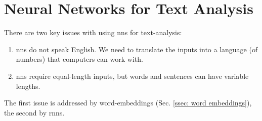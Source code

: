 \section{Neural Networks for Text Analysis \label{sec: NNs for text}}
    There are two key issues with using \glspl{nn} for text-analysis:
    
    \begin{enumerate}
    \item \glspl{nn} do not speak English. We need to translate the inputs into a language (of numbers) that computers can work with. 

    \item \glspl{nn} require equal-length inputs, but words and sentences can have variable lengths.
    
    \end{enumerate}
    The first issue is addressed by word-\glspl{embedding} (Sec. \ref{ssec: word embeddings}), the second by
    \glspl{rnn}.
    
